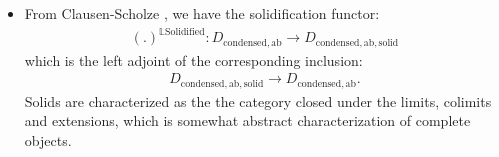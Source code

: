 \documentclass[11pt]{report}
\begin{document}
		



\begin{itemize}
\justifying
\item<3-> From Clausen-Scholze \cite{CS1}, \cite{CS2} we have the solidification functor:
\begin{align}
(.)^{\mathbb{L}\mathrm{Solidified}}: D_{\mathrm{condensed, ab}}\rightarrow D_{\mathrm{condensed, ab, solid}}	
\end{align}
which is the left adjoint of the corresponding inclusion:
\begin{align}
D_{\mathrm{condensed, ab, solid}}\rightarrow D_{\mathrm{condensed, ab}}.	
\end{align}
Solids are characterized as the the category closed under the limits, colimits and extensions, which is somewhat abstract characterization of complete objects.


\end{itemize}
\end{document}
